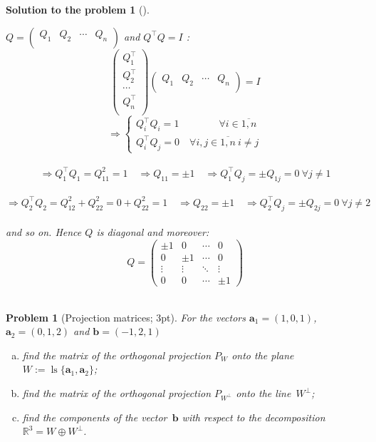 \documentclass[12pt,a4]{article}
\newtheorem{problem}{Problem}
\newtheorem{solution}{Solution to the problem}
\newcommand{\bR}{{\mathbb R}}
\newcommand{\ba}{{\mathbf a}}
\newcommand{\bb}{{\mathbf b}}
\begin{document}
\begin{solution}[]
\begin{enumerate}[(a)]
$Q = 
\begin{pmatrix}
Q_1 & Q_2 & \cdots & Q_n \\
\end{pmatrix}
$ and $Q^\top Q = I$ : 
\[
\begin{pmatrix}
Q_1^\top \\ Q_2^\top \\ \cdots \\ Q_n^\top \\
\end{pmatrix}
\begin{pmatrix}
Q_1 & Q_2 & \cdots & Q_n \\
\end{pmatrix} = I
\]
\[
\Rightarrow
\left\{\begin{matrix}
Q_i^\top Q_i = 1 \qquad \qquad \forall i \in  \overline{1,n}\\[4pt]
Q_i^\top Q_j = 0 \quad \forall i,j \in \overline{1,n} ~ i \neq j
\end{matrix}\right.
\]\\
\[
\Rightarrow Q_1^\top Q_1 = Q_{11}^2 = 1
\quad \Rightarrow Q_{11} = \pm 1
\quad \Rightarrow Q_1^\top Q_j = \pm Q_{1j} = 0
~\forall j \neq 1
\]\\
\[
\Rightarrow Q_2^\top Q_2 = Q_{12}^2 + Q_{22}^2 = 0 + Q_{22}^2 = 1
\quad \Rightarrow Q_{22} = \pm 1
\quad \Rightarrow Q_2^\top Q_j = \pm Q_{2j} = 0
~\forall j \neq 2
\]\\
and so on. Hence $Q$ is diagonal and moreover:
\[
Q = 
\begin{pmatrix}
\pm 1 & 0 & \cdots & 0 \\
0 & \pm 1 & \cdots & 0 \\
\vdots & \vdots & \ddots & \vdots \\
0 & 0 & \cdots & \pm 1
\end{pmatrix}
\]\\
\end{enumerate}
\end{solution}



\begin{problem}[Projection matrices; 3pt]\rm For the vectors $\ba_1=(1,0,1)$, $\ba_2 = (0,1,2)$ and $\bb=(-1,2,1)$
	\begin{enumerate}[(a)]
		\item  find the matrix of the orthogonal projection $P_{W}$ onto the plane $W:=\operatorname{ls}\{\ba_1,\ba_2\}$;
		\item  find the matrix of the orthogonal projection $P_{W^\perp}$ onto the line~$W^\perp$;
		\item find the components of the vector~$\bb$ with respect to the decomposition $\bR^3 = W \oplus W^\perp$.
	\end{enumerate}
\end{problem}
\end{document}

